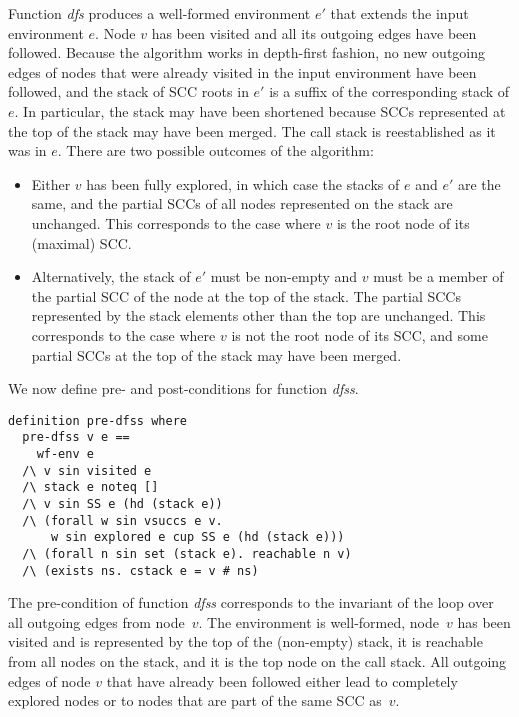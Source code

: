 \documentclass[sigplan,10pt,anonymous,review]{acmart}
\newcommand{\prog}[1]{\textit{#1}}
\begin{document}
Function \prog{dfs} produces a well-formed environment $e'$ that extends the input environment $e$. Node $v$ has been visited and all its outgoing edges have been followed. Because the algorithm works in depth-first fashion, no new outgoing edges of nodes that were already visited in the input environment have been followed, and the stack of SCC roots in $e'$ is a suffix of the corresponding stack of $e$.
In particular, the stack may have been shortened because SCCs represented at the top of the stack may have been merged. The call stack is reestablished as it was in $e$. There are two possible outcomes of the algorithm:
\begin{itemize}
\item Either $v$ has been fully explored, in which case the stacks of $e$ and $e'$ are the same, and the partial SCCs of all nodes represented on the stack are unchanged. This corresponds to the case where $v$ is the root node of its (maximal) SCC.
\item Alternatively, the stack of $e'$ must be non-empty and $v$ must be a member of the partial SCC of the node at the top of the stack. The partial SCCs represented by the stack elements other than the top are unchanged. This corresponds to the case where $v$ is not the root node of its SCC, and some partial SCCs at the top of the stack may have been merged.
\end{itemize}

We now define pre- and post-conditions for function \prog{dfss}.

\begin{small}
\begin{lstlisting}[language=isabelle]
definition pre-dfss where 
  pre-dfss v e ==
    wf-env e 
  /\ v sin visited e
  /\ stack e noteq []
  /\ v sin SS e (hd (stack e))
  /\ (forall w sin vsuccs e v.
      w sin explored e cup SS e (hd (stack e)))
  /\ (forall n sin set (stack e). reachable n v)
  /\ (exists ns. cstack e = v # ns)
\end{lstlisting}
\end{small}

The pre-condition of function \prog{dfss} corresponds to the invariant of the loop over all outgoing edges from node~$v$. The environment is well-formed, node~$v$ has been visited and is represented by the top of the (non-empty) stack, it is reachable from all nodes on the stack, and it is the top node on the call stack. All outgoing edges of node $v$ that have already been followed either lead to completely explored nodes or to nodes that are part of the same SCC as~$v$.
\end{document}

